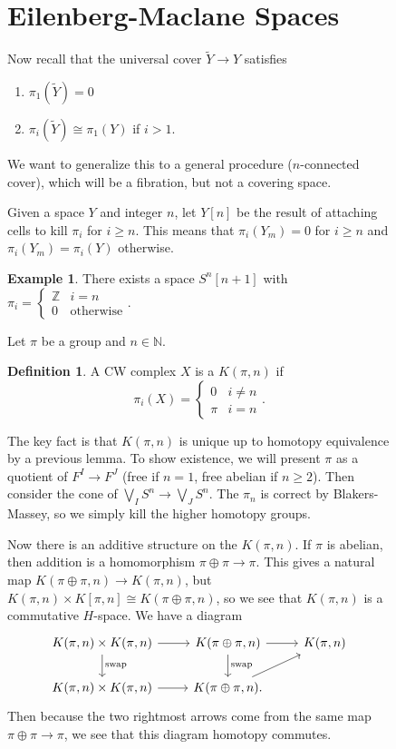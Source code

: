 \documentclass[leqno, openany]{memoir}
\theoremstyle{definition}
\newtheorem{defn}[thm]{Definition}
\newtheorem{exm}[thm]{Example}
\theoremstyle{remark}
\theoremstyle{plain}
\theoremstyle{definition}
\theoremstyle{remark}
\newcommand{\N}{\mathbb{N}}
\newcommand{\Z}{\mathbb{Z}}
\newcommand{\wt}[1]{\widetilde{#1}}
\begin{document}
\begin{figure}[H]
\section{Eilenberg-Maclane Spaces}%

Now recall that the universal cover $\wt{Y} \to Y$ satisfies \begin{enumerate}
\item $\pi_1(\wt{Y}) = 0$ \item $\pi_i(\wt{Y}) \cong \pi_1(Y)$ if $i > 1$.
\end{enumerate} We want to generalize this to a general procedure
($n$-connected cover), which will be a fibration, but not a covering space.

Given a space $Y$ and integer $n$, let $Y[n]$ be the result of attaching cells
to kill $\pi_i$ for $i \geq n$. This means that $\pi_i(Y_m) = 0$ for $i \geq n$
and $\pi_i(Y_m) = \pi_i(Y)$ otherwise.

\begin{exm} There exists a space $S^n[n+1]$ with $\pi_i = \begin{cases} \Z & i
= n \\ 0 & \text{otherwise} \end{cases}$.  \end{exm}

Let $\pi$ be a group and $n \in \N$.  \begin{defn} A CW complex $X$ is a
    $K(\pi, n)$ if \[ \pi_i(X) = \begin{cases} 0 & i \neq n \\ \pi & i = n
    \end{cases}. \] \end{defn}

The key fact is that $K(\pi, n)$ is unique up to homotopy equivalence by a
previous lemma. To show existence, we will present $\pi$ as a quotient of $F^I
\to F^J$ (free if $n=1$, free abelian if $n \geq 2$). Then consider the cone of
$\bigvee_I S^n \to \bigvee_J S^n$. The $\pi_n$ is correct by Blakers-Massey, so
we simply kill the higher homotopy groups.

Now there is an additive structure on the $K(\pi,n)$. If $\pi$ is abelian, then
addition is a homomorphism $\pi \oplus \pi \to \pi$. This gives a natural map
$K(\pi \oplus \pi, n) \to K(\pi,n)$, but $K(\pi,n) \times K[\pi, n] \cong K(\pi
\oplus \pi, n)$, so we see that $K(\pi,n)$ is a commutative $H$-space. We have
a diagram \begin{equation*} \begin{tikzcd} K(\pi,n) \times K(\pi, n)
    \arrow{d}{\text{swap}} \arrow{r} & K(\pi \oplus \pi, n) \arrow{r}
    \arrow{d}{\text{swap}} &  K(\pi,n) \\ K(\pi, n) \times K(\pi, n) \arrow{r}
                           & K(\pi \oplus \pi, n). \arrow{ur} \end{tikzcd}
    \end{equation*} Then because the two rightmost arrows come from the same
    map $\pi \oplus \pi \to \pi$, we see that this diagram homotopy commutes.


\end{figure}
\end{document}
